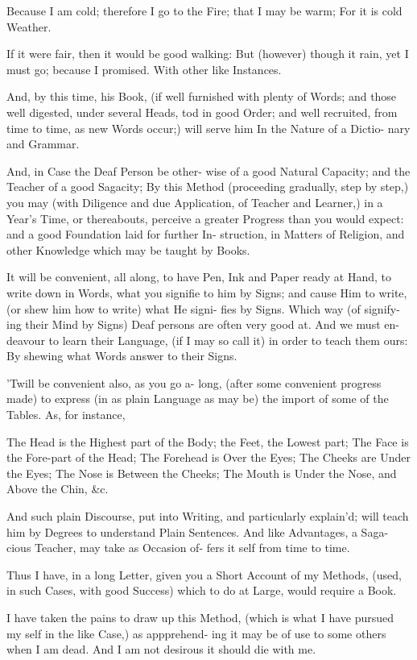 Because I am cold; therefore I go to
the Fire; that I may be warm; For it is
cold Weather.

If it were fair, then it would be good
walking: But (however) though it rain,
yet I must go; because I promised. With
other like Instances.

And, by this time, his Book, (if well
furnished with plenty of Words; and
those well digested, under several Heads,
tod in good Order; and well recruited,
from time to time, as new Words occur;)
will serve him In the Nature of a Dictio-
nary and Grammar.

And, in Case the Deaf Person be other-
wise of a good Natural Capacity; and
the Teacher of a good Sagacity; By this
Method (proceeding gradually, step by
step,) you may (with Diligence and due
Application, of Teacher and Learner,) in
a Year's Time, or thereabouts, perceive a
greater Progress than you would expect:
and a good Foundation laid for further In-
struction, in Matters of Religion, and other
Knowledge which may be taught by Books.

It will be convenient, all along, to have
Pen, Ink and Paper ready at Hand, to write
down in Words, what you signifie to him
by Signs; and cause Him to write, (or
shew him how to write) what He signi-
fies by Signs. Which way (of signify-
ing their Mind by Signs) Deaf persons
are often very good at. And we must en-
deavour to learn their Language, (if I
may so call it) in order to teach them
ours: By shewing what Words answer
to their Signs.

'Twill be convenient also, as you go a-
long, (after some convenient progress
made) to express (in as plain Language
as may be) the import of some of the
Tables. As, for instance,

The Head is the Highest part of the
Body; the Feet, the Lowest part; The
Face is the Fore-part of the Head; The
Forehead is Over the Eyes; The Cheeks are
Under the Eyes; The Nose is Between the
Cheeks; The Mouth is Under the Nose,
and Above the Chin, &c.

And such plain Discourse, put into
Writing, and particularly explain'd; will
teach him by Degrees to understand Plain
Sentences. And like Advantages, a Saga-
cious Teacher, may take as Occasion of-
fers it self from time to time.

Thus I have, in a long Letter, given
you a Short Account of my Methods,
(used, in such Cases, with good Success)
which to do at Large, would require a
Book.

I have taken the pains to draw up this
Method, (which is what I have pursued
my self in the like Case,) as appprehend-
ing it may be of use to some others when I
am dead. And I am not desirous it should
die with me.

